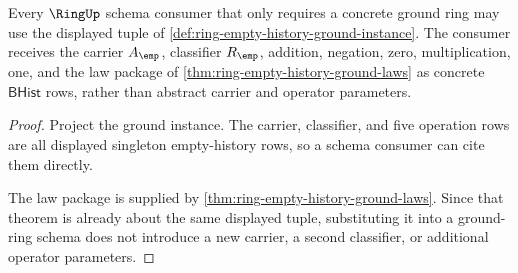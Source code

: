 \begin{theorem}
\label{thm:ring-empty-history-schema-unlock}
Every $\RingUp$ schema consumer that only requires a concrete ground ring may
use the displayed tuple of
\autoref{def:ring-empty-history-ground-instance}. The consumer receives the
carrier $A_{\emp}$, classifier $R_{\emp}$, addition, negation, zero,
multiplication, one, and the law package of
\autoref{thm:ring-empty-history-ground-laws} as concrete $\mathsf{BHist}$ rows,
rather than abstract carrier and operator parameters.
\end{theorem}
\begin{proof}
Project the ground instance. The carrier, classifier, and five operation rows
are all displayed singleton empty-history rows, so a schema consumer can cite
them directly.

The law package is supplied by
\autoref{thm:ring-empty-history-ground-laws}. Since that theorem is already
about the same displayed tuple, substituting it into a ground-ring schema
does not introduce a new carrier, a second classifier, or additional operator
parameters.
\end{proof}
